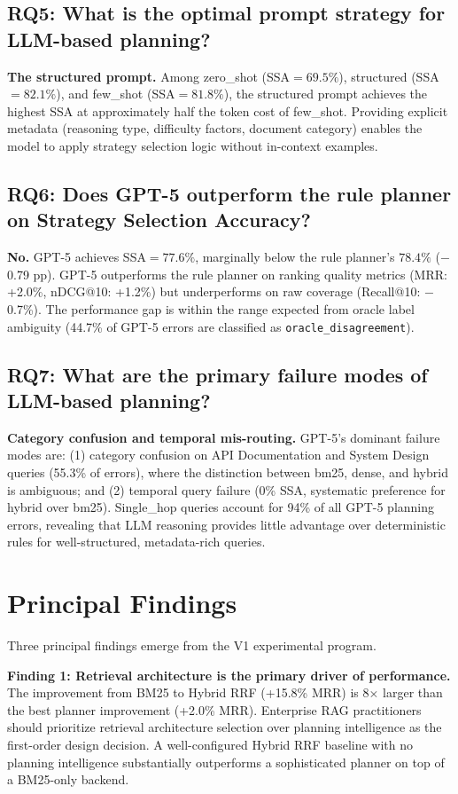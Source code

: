\subsection*{RQ5: What is the optimal prompt strategy for LLM-based planning?}
\textbf{The structured prompt.} Among zero\_shot (SSA$={69.5\%}$), structured (SSA$={82.1\%}$), and few\_shot (SSA$={81.8\%}$), the structured prompt achieves the highest SSA at approximately half the token cost of few\_shot. Providing explicit metadata (reasoning type, difficulty factors, document category) enables the model to apply strategy selection logic without in-context examples.

\subsection*{RQ6: Does GPT-5 outperform the rule planner on Strategy Selection Accuracy?}
\textbf{No.} GPT-5 achieves SSA$={77.6\%}$, marginally below the rule planner's $78.4\%$ ($-$0.79 pp). GPT-5 outperforms the rule planner on ranking quality metrics (MRR: +2.0\%, nDCG@10: +1.2\%) but underperforms on raw coverage (Recall@10: $-$0.7\%). The performance gap is within the range expected from oracle label ambiguity (44.7\% of GPT-5 errors are classified as \texttt{oracle\_disagreement}).

\subsection*{RQ7: What are the primary failure modes of LLM-based planning?}
\textbf{Category confusion and temporal mis-routing.} GPT-5's dominant failure modes are: (1) category confusion on API Documentation and System Design queries (55.3\% of errors), where the distinction between bm25, dense, and hybrid is ambiguous; and (2) temporal query failure (0\% SSA, systematic preference for hybrid over bm25). Single\_hop queries account for 94\% of all GPT-5 planning errors, revealing that LLM reasoning provides little advantage over deterministic rules for well-structured, metadata-rich queries.

\section{Principal Findings}
\label{sec:conc_findings}

Three principal findings emerge from the V1 experimental program.

\textbf{Finding 1: Retrieval architecture is the primary driver of performance.} The improvement from BM25 to Hybrid RRF (+15.8\% MRR) is 8$\times$ larger than the best planner improvement (+2.0\% MRR). Enterprise RAG practitioners should prioritize retrieval architecture selection over planning intelligence as the first-order design decision. A well-configured Hybrid RRF baseline with no planning intelligence substantially outperforms a sophisticated planner on top of a BM25-only backend.

